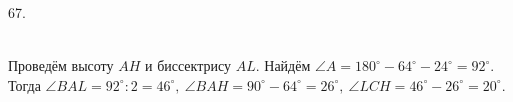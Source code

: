 67. \begin{figure}[ht!]
\end{figure}\\
Проведём высоту $AH$ и биссектрису $AL.$ Найдём $\angle A=180^\circ-64^\circ-24^\circ=92^\circ.$ Тогда $\angle BAL=92^\circ:2=46^\circ,\ \angle BAH=90^\circ-64^\circ=26^\circ,\ \angle LCH=46^\circ-26^\circ=20^\circ.$\newpage\noindent
